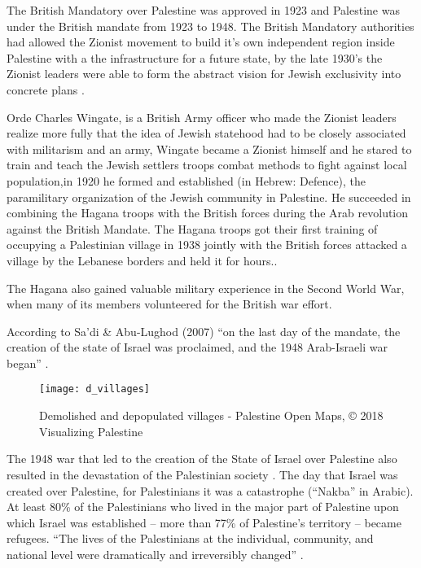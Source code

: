  
 
 The British Mandatory over Palestine was approved in 1923 and Palestine was under the British mandate from 1923 to 1948. The British Mandatory authorities had allowed the Zionist movement to build it's own independent region inside Palestine with a the infrastructure for a future state, by the late 1930's the Zionist leaders were able to form the abstract vision for Jewish exclusivity into concrete plans \citep{Pappe2006}.  
 
Orde Charles Wingate, is a British Army officer who made the Zionist leaders realize more fully that the idea of Jewish statehood had to be closely associated with militarism and an army, Wingate became a Zionist himself and he stared to train and teach the Jewish settlers troops combat methods to fight against local population,in 1920 he formed and established  (in Hebrew: Defence), the paramilitary organization of the Jewish community in Palestine. He succeeded in combining the Hagana troops with the British forces during the Arab revolution against the British Mandate. The Hagana troops got their first training of occupying a Palestinian village in 1938 jointly with the British forces attacked a village by the Lebanese borders and held it for hours\citep{Pappe2006}.\cite [p.112]{Fenby2018}. 

The Hagana also gained valuable military experience in the Second
World War, when many of its members volunteered for the British war
effort.\citep{Pappe2006} 
 
 
 
 According to Sa’di \& Abu-Lughod
(2007) “on the last day of the mandate, the creation of the state of Israel was proclaimed,
and the 1948 Arab-Israeli war began” \citep{Sadi2007}. 

\begin{wrapfigure}{r}{0.20\textwidth} %
    \centering
    \texttt{[image: d\_villages]}
    \caption{Demolished and depopulated villages - Palestine Open Maps, © 2018  Visualizing Palestine}
    \label{fig:map}
\end{wrapfigure}



The 1948 war that led to the creation of the State of Israel over Palestine also resulted in the devastation of the Palestinian society \citep{Sadi2007}. The day that Israel was created over Palestine, for Palestinians it was a catastrophe (“Nakba” in Arabic). At least 80\% of the Palestinians who lived in the major part of Palestine upon which Israel was established – more than 77\% of Palestine’s territory – became refugees. “The lives of the Palestinians at the individual,
community, and national level were dramatically and irreversibly changed” \citep{Sadi2007}.








